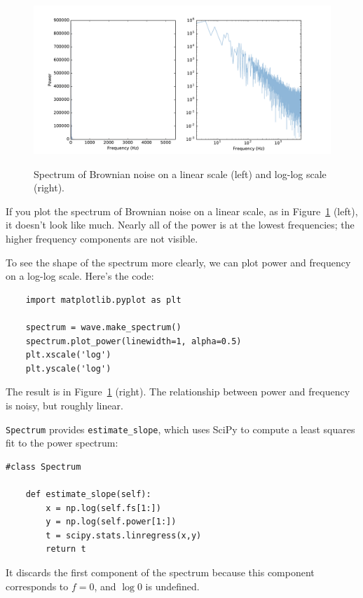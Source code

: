 \documentclass[12pt]{book}
\begin{document}
\begin{figure}
\centerline{\includegraphics[height=2.5in]{figs/rednoise3.pdf}}
\caption{Spectrum of Brownian noise on a linear scale (left) and
  log-log scale (right).}
\label{fig.rednoise3}
\end{figure}

If you plot the spectrum of Brownian noise on a linear scale, as
in Figure~\ref{fig.rednoise3} (left), it
doesn't look like much.  Nearly all of the power is at the lowest
frequencies; the higher frequency components are not visible.

To see the shape of the spectrum more clearly, we can plot power
and frequency on a log-log scale.  Here's the code:

\begin{verbatim}
	import matplotlib.pyplot as plt

    spectrum = wave.make_spectrum()
    spectrum.plot_power(linewidth=1, alpha=0.5)
    plt.xscale('log')
    plt.yscale('log')
\end{verbatim}


The result is in Figure~\ref{fig.rednoise3} (right).  The relationship between
power and frequency is noisy, but roughly linear.

{\tt Spectrum} provides \verb"estimate_slope", which uses SciPy to compute
a least squares fit to the power spectrum:

\begin{verbatim}
#class Spectrum

    def estimate_slope(self):
        x = np.log(self.fs[1:])
        y = np.log(self.power[1:])
        t = scipy.stats.linregress(x,y)
        return t
\end{verbatim}

It discards the first component of the spectrum because
this component corresponds to $f=0$, and $\log 0$ is undefined.
\end{document}
